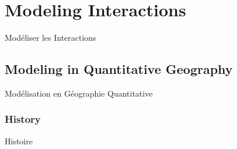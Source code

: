 




\newpage

\section{Modeling Interactions}{Modéliser les Interactions}
\label{sec:modelingsa}






\subsection{Modeling in Quantitative Geography}{Modélisation en Géographie Quantitative}


\subsubsection{History}{Histoire}

